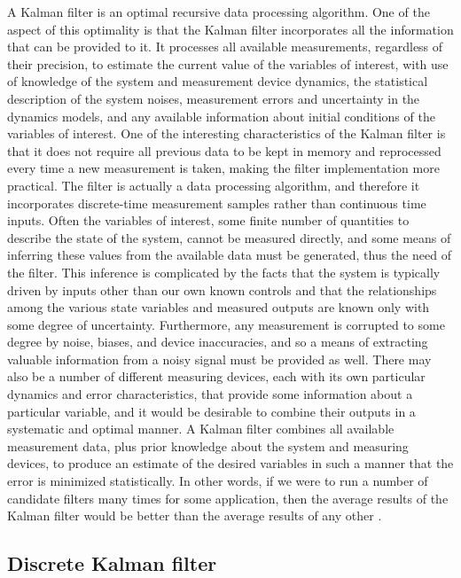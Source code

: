 A Kalman filter is an optimal recursive data processing algorithm. One of the aspect of this optimality is that the Kalman filter incorporates all the information that can be provided to it. It processes all available measurements, regardless of their precision, to estimate the current value of the variables of interest, with use of knowledge of the system and measurement device dynamics, the statistical description of the system noises, measurement errors and uncertainty in the dynamics models, and any available information about initial conditions of the variables of interest. One of the interesting characteristics of the Kalman filter is that it does not require all previous data to be kept in memory and reprocessed every time a new measurement is taken, making the filter implementation more practical. The filter is actually a data processing algorithm, and therefore it incorporates discrete-time measurement samples rather than continuous time inputs. Often the variables of interest, some finite number of quantities to describe the state of the system, cannot be measured directly, and some means of inferring these values from the available data must be generated, thus the need of the filter. This inference is complicated by the facts that the system is typically driven by inputs other than our own known controls and that the relationships among the various state variables and measured outputs are known only with some degree of uncertainty. Furthermore, any measurement is corrupted to some degree by noise, biases, and device inaccuracies, and so a means of extracting valuable information from a noisy signal must be provided as well. There may also be a number of different measuring devices, each with its own particular dynamics and error characteristics, that provide some information about a particular variable, and it would be desirable to combine their outputs in a systematic and optimal manner. A Kalman filter combines all available measurement data, plus prior knowledge about the system and measuring devices, to produce an estimate of the desired variables in such a manner that the error is minimized statistically. In other words, if we were to run a number of candidate filters many times for some application, then the average results of the Kalman filter would be better than the average results of any other \cite{Maybeck1979}.

\subsection{Discrete Kalman filter}

